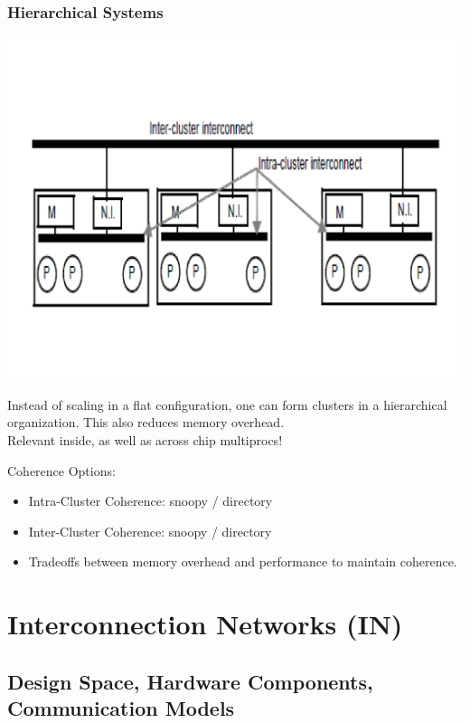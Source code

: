 \documentclass{beamer}
\newcommand{\emp}[1]{\textcolor{DikuRed}{ #1}}
\begin{document}
\begin{frame}[fragile,t]
\frametitle{Hierarchical Systems}

\vspace{-7ex}
\includegraphics[width=44ex]{FigsInfCoherence/HierarchSys}
\vspace{-5ex}

Instead of scaling in a flat configuration, one can form clusters
in a hierarchical organization.   This also reduces memory overhead.\\  
Relevant inside, as well as across chip multiprocs!
\bigskip

\emp{Coherence Options:}
\begin{itemize}
    \item Intra-Cluster Coherence: snoopy / directory
    \item Inter-Cluster Coherence: snoopy / directory
    \item \alert{Tradeoffs} between memory overhead and performance to maintain coherence.
\end  {itemize}
\end{frame}


\section{Interconnection Networks (IN)}

\subsection{Design Space, Hardware Components, Communication Models}

\begin{frame}[fragile]
	\tableofcontents[currentsection]
\end{frame}
\end{document}

